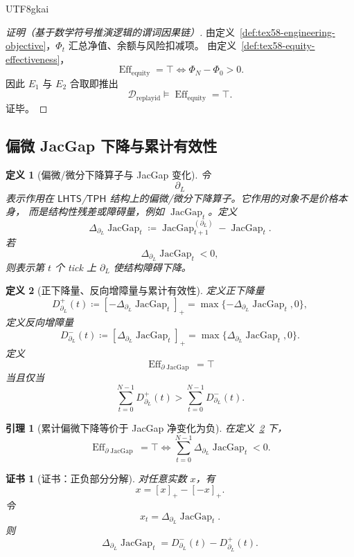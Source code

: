 \documentclass[12pt]{article}
\newtheorem{definition}{定义}[section]
\newtheorem{lemma}{引理}[section]
\newtheorem{Certificate}{证书}[section]
\newcommand{\DefEq}{\coloneqq}
\newcommand{\TPH}{\ensuremath{\mathsf{TPH}}}
\newcommand{\LHTS}{\ensuremath{\mathsf{LHTS}}}
\DeclareMathOperator{\Eff}{Eff}
\DeclareMathOperator{\JacGap}{JacGap}
\begin{document}
\begin{CJK*}{UTF8}{gkai}
\begin{proof}[证明（基于数学符号推演逻辑的谓词因果链）]
由定义~\ref{def:tex58-engineering-objective}，\(\Phi_t\) 汇总净值、余额与风险扣减项。
由定义~\ref{def:tex58-equity-effectiveness}，
\[
  \Eff_{\mathrm{equity}}=\top
  \Longleftrightarrow
  \Phi_N-\Phi_0>0.
\]
因此 \(E_1\) 与 \(E_2\) 合取即推出
\[
  \mathcal D_{\mathrm{replayid}}\models\Eff_{\mathrm{equity}}=\top.
\]
证毕。
\end{proof}

\subsection{偏微 JacGap 下降与累计有效性}
\label{subsec:tex58-partial-jacgap-effectiveness}

\begin{definition}[偏微/微分下降算子与 JacGap 变化]
\label{def:tex58-partial-jacgap-delta}
令
\[
  \partial_L
\]
表示作用在 \LHTS{}/\TPH{} 结构上的偏微/微分下降算子。它作用的对象不是价格本身，
而是结构性残差或障碍量，例如 \(\JacGap_t\)。定义
\[
  \Delta_{\partial_L}\JacGap_t
  \DefEq
  \JacGap_{t+1}^{(\partial_L)}-\JacGap_t.
\]
若
\[
  \Delta_{\partial_L}\JacGap_t<0,
\]
则表示第 \(t\) 个 tick 上 \(\partial_L\) 使结构障碍下降。
\end{definition}

\begin{definition}[正下降量、反向增障量与累计有效性]
\label{def:tex58-positive-negative-jacgap}
定义正下降量
\[
  D^+_{\partial_L}(t)
  \DefEq
  [-\Delta_{\partial_L}\JacGap_t]_+
  =
  \max\{-\Delta_{\partial_L}\JacGap_t,0\},
\]
定义反向增障量
\[
  D^-_{\partial_L}(t)
  \DefEq
  [\Delta_{\partial_L}\JacGap_t]_+
  =
  \max\{\Delta_{\partial_L}\JacGap_t,0\}.
\]
定义
\[
  \Eff_{\partial\JacGap}=\top
\]
当且仅当
\[
  \sum_{t=0}^{N-1}D^+_{\partial_L}(t)
  >
  \sum_{t=0}^{N-1}D^-_{\partial_L}(t).
\]
\end{definition}

\begin{lemma}[累计偏微下降等价于 JacGap 净变化为负]
\label{lem:tex58-partial-jacgap-equivalence}
在定义~\ref{def:tex58-positive-negative-jacgap} 下，
\[
  \Eff_{\partial\JacGap}=\top
  \Longleftrightarrow
  \sum_{t=0}^{N-1}\Delta_{\partial_L}\JacGap_t<0.
\]
\end{lemma}

\begin{Certificate}[证书：正负部分分解]
\label{cert:tex58-partial-jacgap-equivalence}
对任意实数 \(x\)，有
\[
  x=[x]_+-[-x]_+.
\]
令
\[
  x_t=\Delta_{\partial_L}\JacGap_t.
\]
则
\[
  \Delta_{\partial_L}\JacGap_t
  =
  D^-_{\partial_L}(t)-D^+_{\partial_L}(t).
\]
\end{Certificate}


\end{CJK*}
\end{document}
